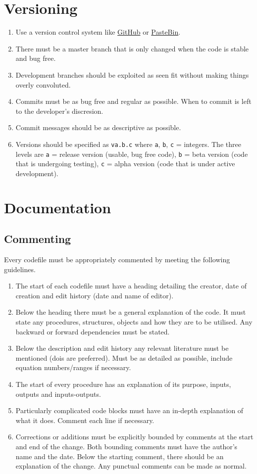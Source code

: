 	\section{Versioning}\label{c:best_practices:s:versioning}
		\begin{enumerate}
			\item Use a version control system like \href{https://github.com/}{GitHub} or \href{https://pastebin.com/}{PasteBin}.
			\item There must be a master branch that is only changed when the code is stable and bug free.
			\item Development branches should be exploited as seen fit without making things overly convoluted.
			\item Commits must be as bug free and regular as possible. When to commit is left to the developer's discresion.
			\item Commit messages should be as descriptive as possible.
			\item Versions should be specified as \texttt{va.b.c} where \texttt{a}, \texttt{b}, \texttt{c} = integers. The three levels are \texttt{a} = release version (usable, bug free code), \texttt{b} = beta version (code that is undergoing testing), \texttt{c} = alpha version (code that is under active development).
		\end{enumerate}
	\section{Documentation}\label{c:best_practices:s:documentation}
		\subsection{Commenting}\label{c:best_practices:s:documentation:ss:commenting}
			Every codefile must be appropriately commented by meeting the following guidelines.
			\begin{enumerate}
				\item The start of each codefile must have a heading detailing the creator, date of creation and edit history (date and name of editor).
				\item Below the heading there must be a general explanation of the code. It must state any procedures, structures, objects and how they are to be utilised. Any backward or forward dependencies must be stated.
				\item Below the description and edit history any relevant literature must be mentioned (dois are preferred). Must be as detailed as possible, include equation numbers/ranges if necessary.
				\item The start of every procedure has an explanation of its purpose, inputs, outputs and inputs-outputs.
				\item Particularly complicated code blocks must have an in-depth explanation of what it does. Comment each line if necessary.
				\item Corrections or additions must be explicitly bounded by comments at the start and end of the change. Both bounding comments must have the author's name and the date. Below the starting comment, there should be an explanation of the change. Any punctual comments can be made as normal.
			\end{enumerate}
